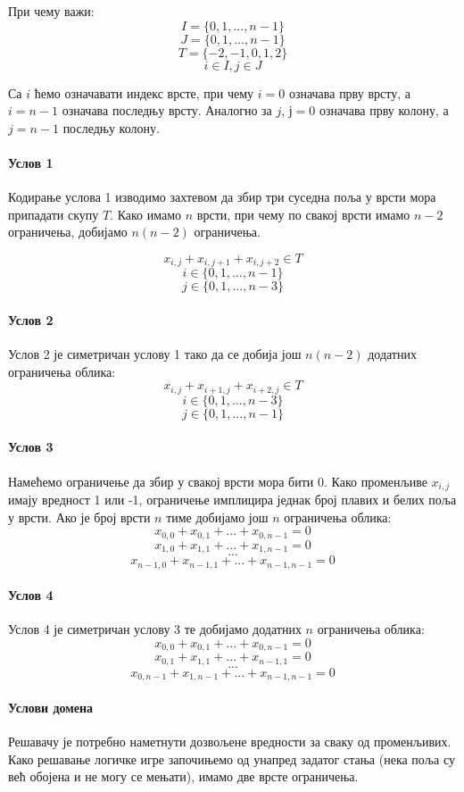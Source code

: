 \documentclass[a4paper]{article}
\begin{document}
При чему важи:
$$ I = \{0, 1, ..., n-1\} $$
$$ J = \{0, 1, ..., n-1\} $$
$$ T = \{-2, -1, 0, 1, 2\} $$
$$ i \in I, j \in J $$

Са $i$ ћемо означавати индекс врсте, при чему $i= 0$ означава прву врсту, а $i = n-1$ означава последњу врсту. Аналогно за  $j$,
$ј = 0$ означава прву колону, а  $j = n-1$ последњу колону.


\paragraph{Услов 1}
Кодирање услова 1 изводимо захтевом да збир три суседна поља у врсти мора припадати скупу $T$. Како имамо $n$ врсти,
при чему по свакој врсти имамо $n-2$ ограничења, добијамо $n(n-2)$ ограничења.

$$ x_{i,j} + x_{i, j+1} + x_{i, j+2} \in T $$
$$ i \in \{0, 1, ..., n-1\} $$
$$ j \in \{0, 1, ..., n-3\} $$

\paragraph{Услов 2}
Услов 2 је симетричан услову 1 тако да се добија још $n(n-2)$ додатних ограничења облика:
$$ x_{i, j} + x_{i+1, j} + x_{i+2, j} \in T $$
$$ i \in \{0, 1, ..., n-3\} $$
$$ j \in \{0, 1, ..., n-1\} $$

\paragraph{Услов 3}
Намећемо ограничење да збир у свакој врсти мора бити 0. Како променљиве $x_{i, j}$ имају вредност 1 или -1, ограничење
имплицира једнак број плавих и белих поља у врсти. Ако је број врсти $n$ тиме добијамо још $n$ ограничења облика:
$$ x_{0, 0} + x_{0, 1} + ... + x_{0, n-1} = 0 $$
$$ x_{1, 0} + x_{1, 1} + ... + x_{1, n-1} = 0 $$
$$ ...  $$
$$ x_{n-1, 0} + x_{n-1, 1} + ... + x_{n-1, n-1} = 0 $$

\paragraph{Услов 4}
Услов 4 је симетричан услову 3 те добијамо додатних $n$ ограничења облика:
$$ x_{0, 0} + x_{0, 1} + ... + x_{0, n-1} = 0 $$
$$ x_{0, 1} + x_{1, 1} + ... + x_{n-1, 1} = 0 $$
$$ ...  $$
$$ x_{0, n-1} + x_{1, n-1} + ... + x_{n-1, n-1} = 0 $$

\paragraph{Услови домена}
Решавачу је потребно наметнути дозвољене вредности за сваку од променљивих. Како решавање логичке игре започињемо
од унапред задатог стања (нека поља су већ обојена и не могу се мењати), имамо две врсте ограничења.
\end{document}
